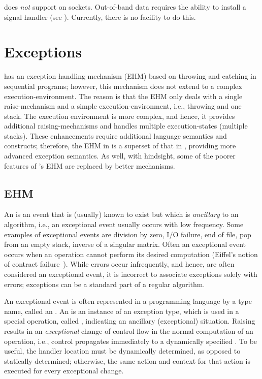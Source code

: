 \documentclass[openright,twoside]{report}
\begin{document}
\begin{annotation}
\uC does \emph{not} support  on sockets.
Out-of-band data requires the ability to install a signal handler (see ).
Currently, there is no facility to do this.
\end{annotation}


\chapter{Exceptions}
\label{s:Exceptions}

\CC has an exception handling mechanism (EHM) based on throwing and catching in sequential programs;
however, this mechanism does not extend to a complex execution-environment.
The reason is that the \CC EHM only deals with a single raise-mechanism and a simple execution-environment, i.e., throwing and one stack.
The \uC execution environment is more complex, and hence, it provides additional raising-mechanisms and handles multiple execution-states (multiple stacks).
These enhancements require additional language semantics and constructs;
therefore, the EHM in \uC is a superset of that in \CC, providing more advanced exception semantics.
As well, with hindsight, some of the poorer features of \CC's EHM are replaced by better mechanisms.


\section{EHM}

An  is an event that is (usually) known to exist but which is \emph{ancillary} to an algorithm, i.e., an exceptional event usually occurs with low frequency.
Some examples of exceptional events are division by zero, I/O failure, end of file, pop from an empty stack, inverse of a singular matrix.
Often an exceptional event occurs when an operation cannot perform its desired computation (Eiffel's notion of contract failure~\cite[p.~395]{Eiffel}).
While errors occur infrequently, and hence, are often considered an exceptional event, it is incorrect to associate exceptions solely with errors;
exceptions can be a standard part of a regular algorithm.

An exceptional event is often represented in a programming language by a type name, called an .
An  is an instance of an exception type, which is used in a special operation, called , indicating an ancillary (exceptional) situation.
Raising results in an \emph{exceptional} change of control flow in the normal computation of an operation, i.e., control propagates immediately to a dynamically specified .
To be useful, the handler location must be dynamically determined, as opposed to statically determined;
otherwise, the same action and context for that action is executed for every exceptional change.
\end{document}
